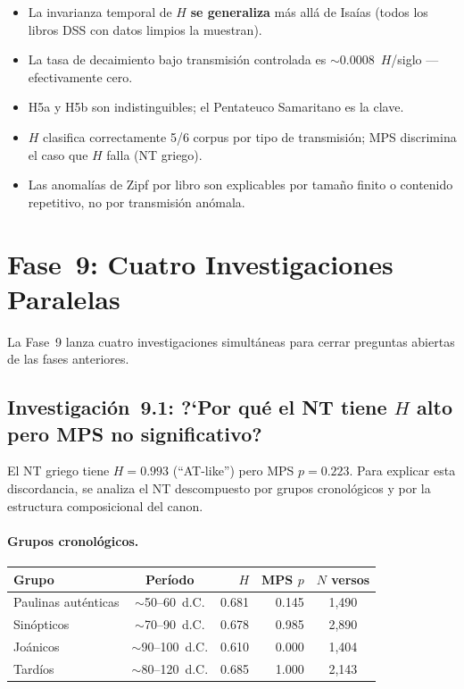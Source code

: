 \documentclass[12pt,a4paper]{article}
\begin{document}
\begin{itemize}[leftmargin=2em]
\item La invarianza temporal de $H$ \textbf{se generaliza} m\'as all\'a de Isa\'ias
      (todos los libros DSS con datos limpios la muestran).
\item La tasa de decaimiento bajo transmisi\'on controlada es
      $\sim$0.0008~$H$/siglo ---efectivamente cero.
\item H5a y H5b son indistinguibles; el Pentateuco Samaritano es la clave.
\item $H$ clasifica correctamente 5/6 corpus por tipo de transmisi\'on;
      MPS discrimina el caso que $H$ falla (NT griego).
\item Las anomal\'ias de Zipf por libro son explicables por tama\~no finito
      o contenido repetitivo, no por transmisi\'on an\'omala.
\end{itemize}


\section{Fase~9: Cuatro Investigaciones Paralelas}

La Fase~9 lanza cuatro investigaciones simult\'aneas para cerrar preguntas abiertas
de las fases anteriores.

\subsection{Investigaci\'on~9.1: ?`Por qu\'e el NT tiene $H$ alto pero MPS no significativo?}

El NT griego tiene $H = 0.993$ (``AT-like'') pero MPS $p = 0.223$. Para explicar
esta discordancia, se analiza el NT descompuesto por grupos cronol\'ogicos y
por la estructura composicional del canon.

\paragraph{Grupos cronol\'ogicos.}
\begin{center}
\begin{tabular}{lcrrc}
\toprule
\textbf{Grupo} & \textbf{Per\'iodo} & \textbf{$H$} & \textbf{MPS $p$} & \textbf{$N$ versos} \\
\midrule
Paulinas aut\'enticas & $\sim$50--60~d.C. & 0.681 & 0.145 & 1,490 \\
Sin\'opticos          & $\sim$70--90~d.C. & 0.678 & 0.985 & 2,890 \\
Jo\'anicos            & $\sim$90--100~d.C. & 0.610 & 0.000 & 1,404 \\
Tard\'ios             & $\sim$80--120~d.C. & 0.685 & 1.000 & 2,143 \\
\bottomrule
\end{tabular}
\end{center}
\end{document}
